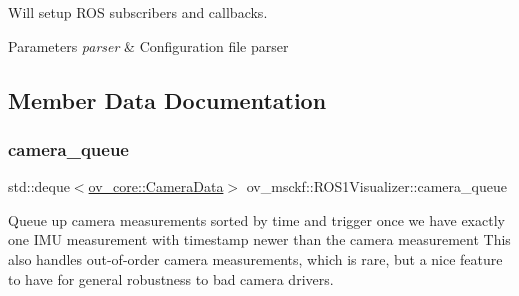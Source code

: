 Will setup R\+OS subscribers and callbacks. 


\begin{DoxyParams}{Parameters}
{\em parser} & Configuration file parser \\
\hline
\end{DoxyParams}


\subsection{Member Data Documentation}
\mbox{\label{classov__msckf_1_1ROS1Visualizer_a96e92f8bf544cc689e3fd203d3340e97}} 
\subsubsection{\texorpdfstring{camera\+\_\+queue}{camera\_queue}}
{\footnotesize\ttfamily std\+::deque$<$\hyperlink{structov__core_1_1CameraData}{ov\+\_\+core\+::\+Camera\+Data}$>$ ov\+\_\+msckf\+::\+R\+O\+S1\+Visualizer\+::camera\+\_\+queue\hspace{0.3cm}{\ttfamily [protected]}}

Queue up camera measurements sorted by time and trigger once we have exactly one I\+MU measurement with timestamp newer than the camera measurement This also handles out-\/of-\/order camera measurements, which is rare, but a nice feature to have for general robustness to bad camera drivers. 